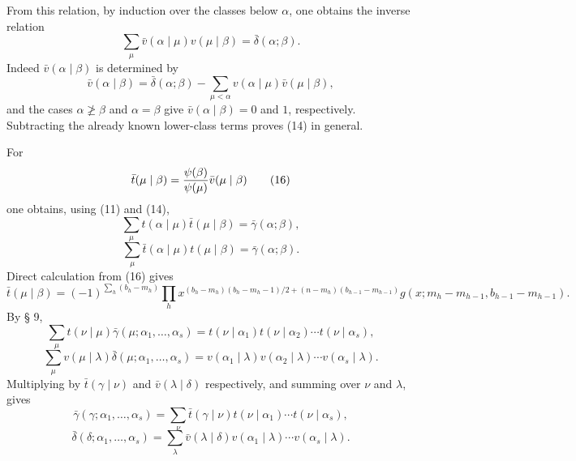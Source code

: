 \documentclass[11pt,a4paper]{article}
\begin{document}
From this relation, by induction over the classes below $\alpha$, one obtains the inverse relation
\begin{equation}
 \sum_\mu\bar v(\alpha\mid\mu)v(\mu\mid\beta)=\bar\delta(\alpha;\beta).
\tag{14}
\end{equation}
Indeed $\bar v(\alpha\mid\beta)$ is determined by
\begin{equation}
 \bar v(\alpha\mid\beta)=\bar\delta(\alpha;\beta)
 -\sum_{\mu<\alpha}v(\alpha\mid\mu)\bar v(\mu\mid\beta),
\tag{13}
\end{equation}
and the cases $\alpha\not\ge\beta$ and $\alpha=\beta$ give $\bar v(\alpha\mid\beta)=0$ and $1$, respectively. Subtracting the already known lower-class terms proves (14) in general.

For
\begin{equation}
 \bar t(\mu\mid\beta)={\psi(\beta)\over\psi(\mu)}\bar v(\mu\mid\beta)
\tag{16}
\end{equation}
one obtains, using (11) and (14),
\begin{equation}
 \sum_\mu t(\alpha\mid\mu)\bar t(\mu\mid\beta)=\bar\gamma(\alpha;\beta),
\tag{17}
\end{equation}
\begin{equation}
 \sum_\mu\bar t(\alpha\mid\mu)t(\mu\mid\beta)=\bar\gamma(\alpha;\beta).
\tag{18}
\end{equation}
Direct calculation from (16) gives
\begin{equation}
 \bar t(\mu\mid\beta)=(-1)^{\sum_h(b_h-m_h)}
 \prod_h x^{(b_h-m_h)(b_h-m_h-1)/2+(n-m_h)(b_{h-1}-m_{h-1})}
 g(x;m_h-m_{h-1},b_{h-1}-m_{h-1}).
\tag{19}
\end{equation}
By § 9,
\begin{equation}
 \sum_\mu t(\nu\mid\mu)\bar\gamma(\mu;\alpha_1,\ldots,\alpha_s)
 =t(\nu\mid\alpha_1)t(\nu\mid\alpha_2)\cdots t(\nu\mid\alpha_s),
\tag{20}
\end{equation}
\begin{equation}
 \sum_\mu v(\mu\mid\lambda)\bar\delta(\mu;\alpha_1,\ldots,\alpha_s)
 =v(\alpha_1\mid\lambda)v(\alpha_2\mid\lambda)\cdots v(\alpha_s\mid\lambda).
\tag{21}
\end{equation}
Multiplying by $\bar t(\gamma\mid\nu)$ and $\bar v(\lambda\mid\delta)$ respectively, and summing over $\nu$ and $\lambda$, gives
\begin{equation}
 \bar\gamma(\gamma;\alpha_1,
\ldots,\alpha_s)=\sum_\nu \bar t(\gamma\mid\nu)t(\nu\mid\alpha_1)\cdots t(\nu\mid\alpha_s),
\tag{22}
\end{equation}
\begin{equation}
 \bar\delta(\delta;\alpha_1,
\ldots,\alpha_s)=\sum_\lambda \bar v(\lambda\mid\delta)v(\alpha_1\mid\lambda)\cdots v(\alpha_s\mid\lambda).
\tag{23}
\end{equation}
\end{document}

